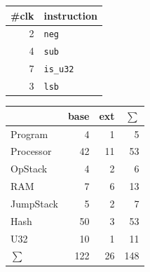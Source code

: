 \documentclass{article}
\begin{document}
\begin{minipage}[t][0.6\textheight][s]{0.3\textwidth}
    \vfill
    \begin{tabular}{rl}
        \toprule
        \#clk & instruction      \\ \midrule
            2 & \texttt{neg}     \\
            4 & \texttt{sub}     \\
            7 & \texttt{is\_u32} \\
            3 & \texttt{lsb}     \\ \bottomrule
    \end{tabular}
    \vspace*{3em}

    \begin{tabular}{lrrr}
        \toprule
                    & base & ext & $\sum$ \\ \midrule
        Program     &    4 &   1 &      5 \\
        Processor   &   42 &  11 &     53 \\
        OpStack     &    4 &   2 &      6 \\
        RAM         &    7 &   6 &     13 \\
        JumpStack   &    5 &   2 &      7 \\
        Hash        &   50 &   3 &     53 \\
        U32         &   10 &   1 &     11 \\ \bottomrule\bottomrule
        $\sum$      &  122 &  26 &    148
    \end{tabular}
\end{minipage}%
\hfill%
\end{document}
